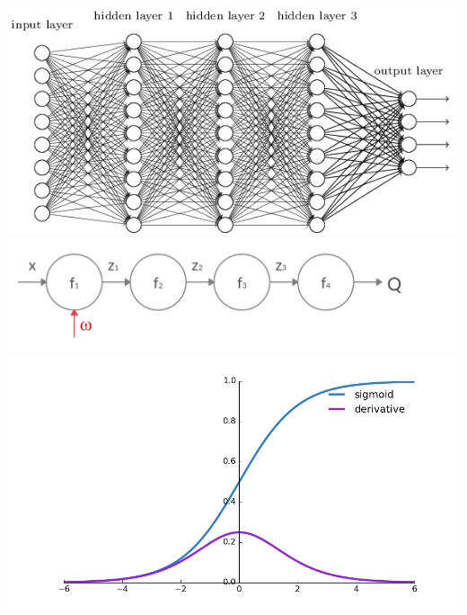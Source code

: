 \documentclass[aspectratio=169,usenames,dvipsnames]{beamer}
\begin{document}
\begin{frame}
\begin{columns}
	\centering
	\includegraphics[width=0.6\linewidth]{DNN}
	\includegraphics[width=1\linewidth]{vanishing_grad_NN}
	\includegraphics[width=0.6\linewidth]{sigmoid_der}
	
\end{columns}


\end{frame}

\end{document}

